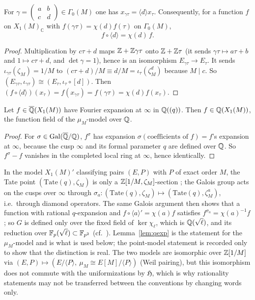 \begin{lemma}\label{lem:diamond}
For $\gamma=\begin{pmatrix}a&b\\c&d\end{pmatrix}\in\Gamma_0(M)$ one has
$x_{\gamma\tau}=\langle d\rangle x_\tau$. Consequently, for a function $f$ on $X_1(M)_{\mathbb C}$
with $f(\gamma\tau)=\chi(d)f(\tau)$ on $\Gamma_0(M)$,
\[
f\circ\langle d\rangle=\chi(d)\,f .
\]
\end{lemma}
\begin{proof}
Multiplication by $c\tau+d$ maps $\mathbb Z+\mathbb Z\gamma\tau$ onto $\mathbb Z+\mathbb Z\tau$ (it sends $\gamma\tau\mapsto a\tau+b$
and $1\mapsto c\tau+d$, and $\det\gamma=1$), hence is an isomorphism $E_{\gamma\tau}\to E_\tau$. It
sends $\iota_{\gamma\tau}(\zeta_M)=1/M$ to $(c\tau+d)/M\equiv d/M=\iota_\tau(\zeta_M^d)$ because
$M\mid c$. So $(E_{\gamma\tau},\iota_{\gamma\tau})\cong(E_\tau,\iota_\tau\circ[d])$. Then
$(f\circ\langle d\rangle)(x_\tau)=f(x_{\gamma\tau})=f(\gamma\tau)=\chi(d)f(x_\tau)$.
\end{proof}

\begin{lemma}\label{lem:qexp}
Let $f\in\overline{\mathbb Q}(X_1(M))$ have Fourier expansion at $\infty$ in $\mathbb Q((q))$. Then
$f\in\mathbb Q(X_1(M))$, the function field of the $\mu_M$-model over $\mathbb Q$.
\end{lemma}
\begin{proof}
For $\sigma\in\operatorname{Gal}(\overline{\mathbb Q}/\mathbb Q)$, $f^\sigma$ has expansion $\sigma(\text{coefficients of }f)=f$'s
expansion at $\infty$, because the cusp $\infty$ and its formal parameter $q$ are defined over $\mathbb Q$.
So $f^\sigma-f$ vanishes in the completed local ring at $\infty$, hence identically.
\end{proof}

\begin{remark}\label{rem:point}
In the model $X_1(M)'$ classifying pairs $(E,P)$ with $P$ of exact order $M$, the Tate point
$(\mathrm{Tate}(q),\zeta_M)$ is only a $\mathbb Z[1/M,\zeta_M]$-section \citep[Ex.~2.3]{ConradQexp}; the
Galois group acts on the cusps over $\infty$ through $\sigma_a:(\mathrm{Tate}(q),\zeta_M)\mapsto
(\mathrm{Tate}(q),\zeta_M^a)$, i.e.\ through diamond operators. The same Galois argument then shows
that a function with rational $q$-expansion and $f\circ\langle a\rangle'=\chi(a)f$ satisfies
$f^{\sigma_a}=\chi(a)^{-1}f$; so $G$ is defined only over the fixed field of $\ker\chi_\ell$, which is
$\mathbb Q(\sqrt\ell)$, and its reduction over $\mathbb F_p(\sqrt\ell)\subset\mathbb F_{p^2}$
(cf.\ \citealp[\S3.5]{Loeffler}). Lemma~\ref{lem:qexp} is the statement for the $\mu_M$-model and is
what is used below; the point-model statement is recorded only to show that the distinction is
real. The two models are isomorphic over $\mathbb Z[1/M]$ via $(E,P)\mapsto(E/\langle P\rangle,\ \mu_M\cong
E[M]/\langle P\rangle)$ (Weil pairing), but this isomorphism does not commute with the
uniformizations by $\mathfrak H$, which is why rationality statements may not be transferred between
the conventions by changing words only.
\end{remark}


